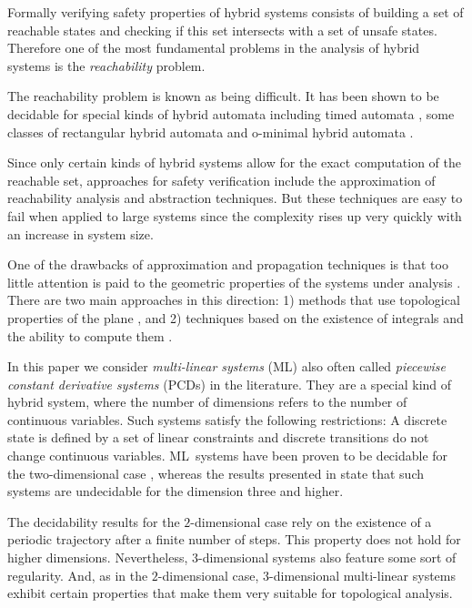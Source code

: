 \documentclass[copyright,creativecommons]{packages/eptcs}
\newcommand{\ml}{\mbox{ML}}
\begin{document}
Formally verifying safety properties of hybrid
systems consists of building a set of reachable states and checking if this
set intersects with a set of unsafe states. Therefore one of the
most fundamental problems in the analysis of hybrid systems is the
\emph{reachability} problem.

The reachability problem is known as being difficult. It has been shown to be
decidable for special kinds of hybrid automata \cite{AD94,HKPV95,LPS00,LPY99,LPY99-2} including timed automata \cite{AD94}, 
some classes of rectangular hybrid automata \cite{HKPV95} and o-minimal hybrid automata \cite{LPS00}. 


Since only  certain kinds of hybrid systems allow  for the exact computation of the reachable set,    approaches for safety verification include  the approximation of reachability analysis and  abstraction techniques. 
But these  techniques are easy to fail when applied to large systems since the complexity rises up very quickly with an increase in system size.

One of the drawbacks of approximation and propagation techniques is that too little attention is paid to the geometric properties of the systems under analysis \cite{ASY07}.  There are two main approaches in this direction: 1) methods that use topological properties of the plane \cite{MP93}, and 2) techniques based on the existence of integrals and the ability to compute them \cite{B99}. 

In this paper we consider {\it multi-linear systems} (\ml) also often called  {\it piecewise constant derivative systems} (PCDs) in the literature.  
They  are a special kind of  hybrid system, where the number of dimensions  refers to the number of continuous 
variables. Such systems satisfy the following restrictions: A discrete state
is defined by a set of linear constraints and 
 discrete transitions do not change continuous variables. 
\ml~systems have been proven to be decidable for the two-dimensional case \cite{MP93}, 
whereas the results presented in \cite{AMP95}
state that such systems are  undecidable for  the dimension three and higher.

The decidability results for the $2$-dimensional case rely on the existence of a periodic trajectory after a finite number of steps. This property does not hold for higher dimensions.
Nevertheless, $3$-dimensional systems also feature some sort of regularity. And, as in the $2$-dimensional case, $3$-dimensional multi-linear systems  exhibit  certain properties that make  them very suitable for topological analysis.  
\end{document}
